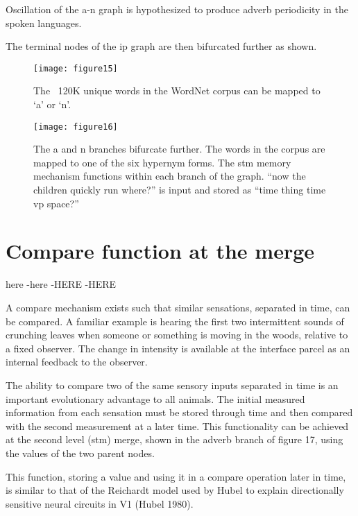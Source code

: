 \documentclass{clv3}
\begin{document}
Oscillation of the a-n graph is hypothesized to produce adverb periodicity in the spoken languages.

The terminal nodes of the ip graph are then bifurcated further as shown.



\begin{figure}[H]
\texttt{[image: figure15]}
\caption{The ~120K unique words in the WordNet corpus can be mapped to ‘a’ or ‘n’. }
\end{figure}

\begin{figure}[H]
\texttt{[image: figure16]}
\caption{ The a and n branches bifurcate further.   The words in the corpus are mapped to one of the six hypernym forms.   The stm memory mechanism functions within each branch of the graph.   “now the children quickly run where?” is input and stored as “time thing time vp space?”}
\end{figure}





\section{Compare function at the merge   }

\small here  
\large -here
\large -HERE
\LARGE -HERE

\normalsize
\vspace{.5cm}
A compare mechanism exists such that similar sensations, separated in time, can be compared.  A familiar example is hearing the first two intermittent sounds of crunching leaves when someone or something is moving in the woods, relative to a fixed observer.   The change in intensity is available at the interface parcel as an internal feedback to the observer.

The ability to compare two of the same sensory inputs separated in time is an important evolutionary advantage to all animals.      The initial measured  information from  each sensation must be stored through time and then compared with the second measurement at a later time.   This functionality can be achieved at the second level (stm) merge, shown in the adverb branch of figure 17, using the values of the two parent nodes.  

This function, storing a value and using it in a compare operation later in time,  is similar to that of the Reichardt model used by Hubel to explain directionally sensitive neural circuits in V1 (Hubel 1980).
\end{document}
